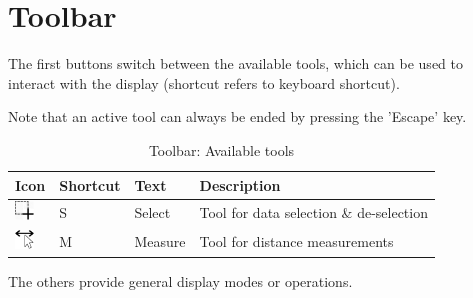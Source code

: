 \section{Toolbar}

The first buttons switch between the available tools, which can be used to interact with the display (shortcut refers to keyboard shortcut).

Note that an active tool can always be ended by pressing the 'Escape' key. 

\begin{table}[H]
  \center
  \begin{tabular}{ | l | l | l | l |}
    \hline
    \textbf{Icon} & \textbf{Shortcut} & \textbf{Text} & \textbf{Description} \\ \hline
    \includegraphics[width=0.5cm,frame]{../../data/icons/select_action.png} & S & Select & Tool for data selection \& de-selection \\ \hline
    \includegraphics[width=0.5cm,frame]{../../data/icons/measure_action.png} & M & Measure & Tool for distance measurements \\ \hline
  \end{tabular}
  \caption{Toolbar: Available tools}
\end{table}

The others provide general display modes or operations.

